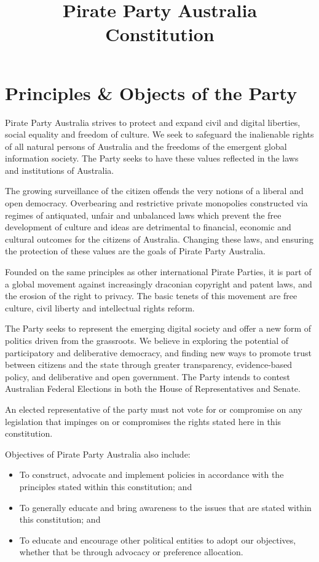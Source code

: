 \documentclass[a4paper,titlepage,8.5pt]{article}
\title{Pirate Party Australia Constitution}
\begin{document}
\tableofcontents
\thispagestyle{empty}
\newpage

\setcounter{page}{1}

\part{Principles \& Objects of the Party}
Pirate Party Australia strives to protect and expand civil and digital liberties, social equality and freedom of culture. We seek to safeguard the inalienable rights of all natural persons of Australia and the freedoms of the emergent global information society. The Party seeks to have these values reflected in the laws and institutions of Australia.

The growing surveillance of the citizen offends the very notions of a liberal and open democracy. Overbearing and restrictive private monopolies constructed via regimes of antiquated, unfair and unbalanced laws which prevent the free development of culture and ideas are detrimental to financial, economic and cultural outcomes for the citizens of Australia. Changing these laws, and ensuring the protection of these values are the goals of Pirate Party Australia.

Founded on the same principles as other international Pirate Parties, it is part of a global movement against increasingly draconian copyright and patent laws, and the erosion of the right to privacy. The basic tenets of this movement are free culture, civil liberty and intellectual rights reform.

The Party seeks to represent the emerging digital society and offer a new form of politics driven from the grassroots. We believe in exploring the potential of participatory and deliberative democracy, and finding new ways to promote trust between citizens and the state through greater transparency, evidence-based policy, and deliberative and open government. The Party intends to contest Australian Federal Elections in both the House of Representatives and Senate.

An elected representative of the party must not vote for or compromise on any legislation that impinges on or compromises the rights stated here in this constitution.


Objectives of Pirate Party Australia also include:
\begin{itemize}
\item To construct, advocate and implement policies in accordance with the principles stated within this constitution; and
\item To generally educate and bring awareness to the issues that are stated within this constitution; and
\item To educate and encourage other political entities to adopt our objectives, whether that be through advocacy or preference allocation.
\end{itemize}
\end{document}
